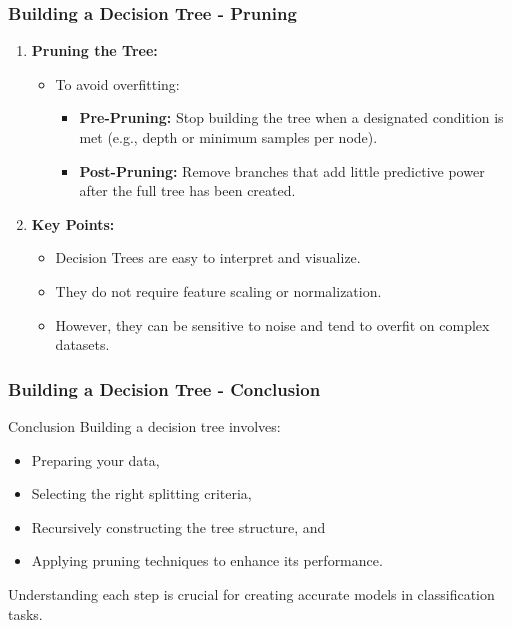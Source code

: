 \documentclass[aspectratio=169]{beamer}
\begin{document}
\begin{frame}[fragile]
    \frametitle{Building a Decision Tree - Pruning}
    \begin{enumerate}[resume]
        \item \textbf{Pruning the Tree:}
            \begin{itemize}
                \item To avoid overfitting:
                    \begin{itemize}
                        \item \textbf{Pre-Pruning:} Stop building the tree when a designated condition is met (e.g., depth or minimum samples per node).
                        \item \textbf{Post-Pruning:} Remove branches that add little predictive power after the full tree has been created.
                    \end{itemize}
            \end{itemize}
        
        \item \textbf{Key Points:}
            \begin{itemize}
                \item Decision Trees are easy to interpret and visualize.
                \item They do not require feature scaling or normalization.
                \item However, they can be sensitive to noise and tend to overfit on complex datasets.
            \end{itemize}
    \end{enumerate}
\end{frame}

\begin{frame}[fragile]
    \frametitle{Building a Decision Tree - Conclusion}
    \begin{block}{Conclusion}
        Building a decision tree involves:
        \begin{itemize}
            \item Preparing your data,
            \item Selecting the right splitting criteria,
            \item Recursively constructing the tree structure, and
            \item Applying pruning techniques to enhance its performance.
        \end{itemize}
        Understanding each step is crucial for creating accurate models in classification tasks.
    \end{block}
\end{frame}
\end{document}
